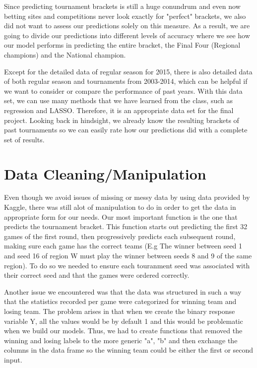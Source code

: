 \documentclass{article} %
\begin{document}
Since predicting tournament brackets is still a huge conundrum and even now betting sites and competitions never look exactly for "perfect" brackets, we also did not want to assess our predictions solely on this measure. As a result, we are going to divide our predictions into different levels of accuracy where we see how our model performs in predicting the entire bracket, the Final Four (Regional champions) and the National champion. 

Except for the detailed data of regular season for 2015, there is also detailed data of both regular season and tournaments from 2003-2014, which can be helpful if we want to consider or compare the performance of past years. With this data set, we can use many methods that we have learned from the class, such as regression and LASSO. Therefore, it is an appropriate data set for the final project. Looking back in hindsight, we already know the resulting brackets of past tournaments so we can easily rate how our predictions did with a complete set of results.

\section{Data Cleaning/Manipulation}

Even though we avoid issues of missing or messy data by using data provided by Kaggle, there was still alot of manipulation to do in order to get the data in appropriate form for our needs. Our most important function is the one that predicts the tournament bracket. This function starts out predicting the first 32 games of the first round, then progressively predicts each subsequent round, making sure each game has the correct teams (E.g The winner between seed 1 and seed 16 of region W must play the winner between seeds 8 and 9 of the same region). To do so we needed to ensure each touranment seed was associated with their correct seed and that the games were ordered correctly.

Another issue we encountered was that the data was structured in such a way that the statistics recorded per game were categorized for winning team and losing team. The problem arises in that when we create the binary response variable Y, all the values would be by default 1 and this would be problematic when we build our models. Thus, we had to create functions that removed the winning and losing labels to the more generic "a", "b" and then exchange the columns in the data frame so the winning team could be either the first or second input.
\end{document}

